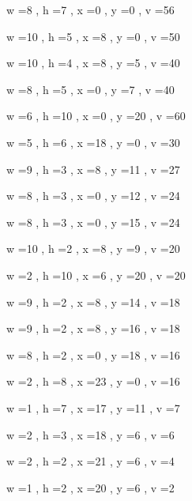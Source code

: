 \documentclass[11pt]{article}
\begin{document}
w =8 , h =7 , x =0 , y =0 , v =56
\par
w =10 , h =5 , x =8 , y =0 , v =50
\par
w =10 , h =4 , x =8 , y =5 , v =40
\par
w =8 , h =5 , x =0 , y =7 , v =40
\par
w =6 , h =10 , x =0 , y =20 , v =60
\par
w =5 , h =6 , x =18 , y =0 , v =30
\par
w =9 , h =3 , x =8 , y =11 , v =27
\par
w =8 , h =3 , x =0 , y =12 , v =24
\par
w =8 , h =3 , x =0 , y =15 , v =24
\par
w =10 , h =2 , x =8 , y =9 , v =20
\par
w =2 , h =10 , x =6 , y =20 , v =20
\par
w =9 , h =2 , x =8 , y =14 , v =18
\par
w =9 , h =2 , x =8 , y =16 , v =18
\par
w =8 , h =2 , x =0 , y =18 , v =16
\par
w =2 , h =8 , x =23 , y =0 , v =16
\par
w =1 , h =7 , x =17 , y =11 , v =7
\par
w =2 , h =3 , x =18 , y =6 , v =6
\par
w =2 , h =2 , x =21 , y =6 , v =4
\par
w =1 , h =2 , x =20 , y =6 , v =2
\par
\newpage
\end{document}
